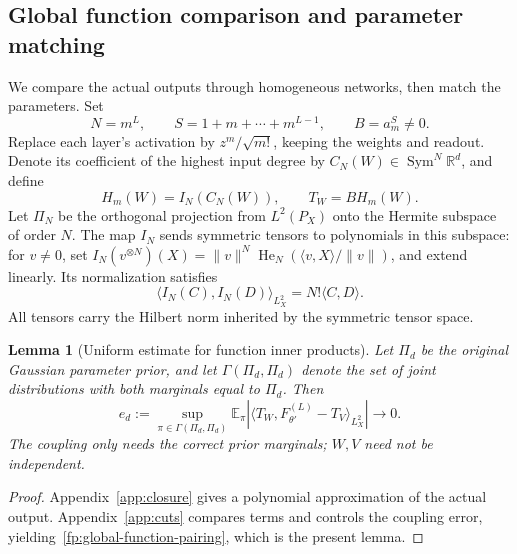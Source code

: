 \documentclass[a4paper]{tufte-handout}
\newtheorem{lemma}{Lemma}
\newcommand{\E}{\mathbb E}
\newcommand{\R}{\mathbb R}
\DeclareMathOperator{\Sym}{Sym}
\begin{document}
\begin{fullwidth}
\section{Global function comparison and parameter matching}
We compare the actual outputs through homogeneous networks, then match the parameters. Set
\[
N=m^L,\qquad S=1+m+\cdots+m^{L-1},\qquad B=a_m^S\ne0.
\]
Replace each layer's activation by $z^m/\sqrt{m!}$, keeping the weights and readout. Denote its coefficient of the highest input degree by $C_N(W)\in\Sym^N\R^d$, and define
\[
H_m(W)=I_N(C_N(W)),\qquad T_W=BH_m(W).
\]
Let $\Pi_N$ be the orthogonal projection from $L^2(P_X)$ onto the Hermite subspace of order $N$. The map $I_N$ sends symmetric tensors to polynomials in this subspace:
for $v\ne0$, set $I_N(v^{\otimes N})(X)=\|v\|^N\operatorname{He}_N(\langle v,X\rangle/\|v\|)$, and extend linearly.
Its normalization satisfies
\begin{equation}\label{fp:actual-isometry}
 \langle I_N(C),I_N(D)\rangle_{L_X^2}=N!\langle C,D\rangle.
\end{equation}
All tensors carry the Hilbert norm inherited by the symmetric tensor space.

\begin{lemma}[Uniform estimate for function inner products]\label{lem:cross}
Let $\Pi_d$ be the original Gaussian parameter prior, and let $\Gamma(\Pi_d,\Pi_d)$ denote the set of joint distributions with both marginals equal to $\Pi_d$. Then
\begin{equation}\label{eq:cross}
e_d:=\sup_{\pi\in\Gamma(\Pi_d,\Pi_d)}
\E_\pi|\langle T_W,F_{\theta'}^{(L)}-T_V\rangle_{L_X^2}|\longrightarrow0.
\end{equation}
The coupling only needs the correct prior marginals; $W,V$ need not be independent.
\end{lemma}
\begin{proof}
Appendix~\ref{app:closure} gives a polynomial approximation of the actual output. Appendix~\ref{app:cuts}
compares terms and controls the coupling error, yielding~\eqref{fp:global-function-pairing}, which is the present lemma.
\end{proof}


\end{fullwidth}
\end{document}
